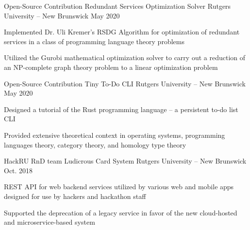 
\begin{cventries}
  \cventry
  {Open-Source Contribution}
  {Redundant Services Optimization Solver}
  {Rutgers University -- New Brunswick}
  {May 2020}
  {
    \begin{cvitems}
    \item {Implemented Dr. Uli Kremer's RSDG Algorithm for optimization of redundant services in a class of programming language theory problems}
    \item {Utilized the Gurobi mathematical optimization solver to carry out a reduction of an NP-complete graph theory problem to a linear optimization problem}
    \end{cvitems}
  }

  \cventry
  {Open-Source Contribution}
  {Tiny To-Do CLI}
  {Rutgers University -- New Brunswick}
  {May 2020}
  {
    \begin{cvitems}
    \item {Designed a tutorial of the Rust programming language -- a persistent to-do list CLI}
    \item {Provided extensive theoretical context in operating systems, programming languages theory, category theory, and homology type theory}
    \end{cvitems}
  }

  \cventry
  {HackRU RnD team}
  {Ludicrous Card System}
  {Rutgers University -- New Brunswick}
  {Oct. 2018}
  {
    \begin{cvitems}
    \item {REST API for web backend services utilized by various web and mobile apps designed for use by hackers and hackathon staff}
    \item {Supported the deprecation of a legacy service in favor of the new cloud-hosted and microservice-based system}
    \end{cvitems}
  }
\end{cventries}
